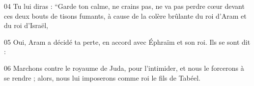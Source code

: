 
04 Tu lui diras : “Garde ton calme, ne crains pas, ne va pas perdre cœur devant ces deux bouts de tisons fumants, à cause de la colère brûlante du roi d’Aram et du roi d’Israël,

05 Oui, Aram a décidé ta perte, en accord avec Éphraïm et son roi. Ils se sont dit :

06 Marchons contre le royaume de Juda, pour l’intimider, et nous le forcerons à se rendre ; alors, nous lui imposerons comme roi le fils de Tabéel.
